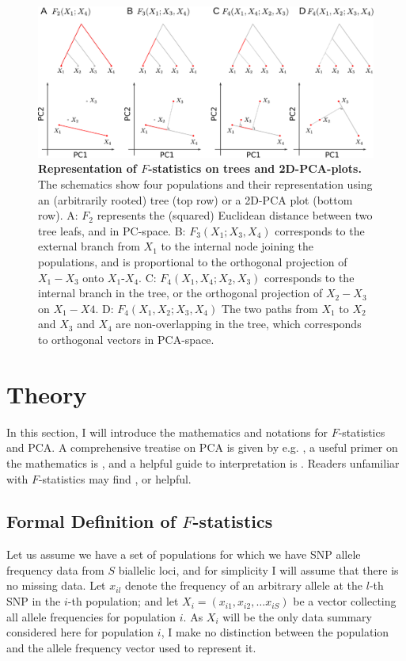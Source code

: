 \documentclass[12pt,fullpage, a4paper]{article}
\begin{document}
\begin{figure}[!ht]
	\includegraphics[width=\textwidth]{figures/fstats_pca_vs_tree.pdf}
	\caption{\textbf{Representation of $F$-statistics on trees and 2D-PCA-plots.} The schematics show four populations and their representation using an (arbitrarily rooted) tree (top row) or a 2D-PCA plot (bottom row). A: $F_2$ represents the (squared) Euclidean distance between two tree leafs, and in PC-space. B: $F_3(X_1; X_3, X_4)$ corresponds to the external branch from $X_1$ to the internal node joining the populations, and is proportional to the orthogonal projection of $X_1 - X_3$ onto $X_1$-$X_4$. C: $F_4(X_1, X_4; X_2, X_3)$ corresponds to the internal branch in the tree, or the orthogonal projection of $X_2 - X_3$ on $X_1 - X4$. D: $F_4(X_1, X_2; X_3, X_4)$ The two paths from $X_1$ to $X_2$ and $X_3$ and $X_4$ are non-overlapping in the tree, which corresponds to orthogonal vectors in PCA-space.}
	\label{fig:geom}
\end{figure}	
	
\section{Theory}
In this section, I will introduce the mathematics and notations for $F$-statistics and PCA. A comprehensive  treatise on PCA is given by e.g. \cite{jolliffe2013}, a useful primer on the mathematics is \cite{pachter2014}, and a helpful guide to interpretation is \cite{cavalli-sforza1994}. Readers unfamiliar with $F$-statistics may find \cite{patterson2012}, \cite{peter2016} or \cite{oteo-garcia2021} helpful.

\subsection{Formal Definition of $F$-statistics}
Let us assume we have a set of populations for which we have SNP allele frequency data from $S$ biallelic loci, and for simplicity I will assume that there is no missing data. Let $x_{il}$ denote the frequency of an arbitrary allele at the $l$-th SNP in the $i$-th population; and let $X_i = (x_{i1}, x_{i2}, \dots x_{iS})$  be a vector collecting all allele frequencies for population $i$. As $X_i$ will be the only data summary considered here for population $i$, I make no distinction between the population and the allele frequency vector used to represent it.
\end{document}
